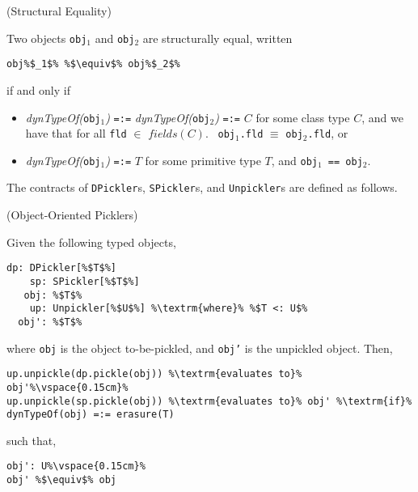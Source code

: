 \documentclass[preprint,10pt]{sigplanconf}
\theoremstyle{definition}
\newcommand{\term}[1]{\mbox{\texttt{#1}}}
\newcommand{\itl}[1]{\mbox{\textit{#1}}}
\begin{document}
\begin{defn}(Structural Equality)

\noindent Two objects \term{obj}$_1$ and \term{obj}$_2$ are structurally equal, written

\begin{lstlisting}[escapechar=\%]
obj%$_1$% %$\equiv$% obj%$_2$%
\end{lstlisting}

\noindent if and only if

\begin{itemize}
\item \itl{dynTypeOf(}\term{obj$_1$}\itl{)} \term{=:=} \itl{dynTypeOf(}\term{obj$_2$}\itl{)} \term{=:=} $C$
      for some class type $C$, and we have that for all \term{fld} $\in$ $\textit{fields}(C)$.
      ~\term{obj$_1$.fld} $\equiv$ \term{obj$_2$.fld}, or
\item \itl{dynTypeOf(}\term{obj$_1$}\itl{)} \term{=:=} $T$ for some primitive type $T$, and \term{obj$_1$ == obj$_2$}.
\end{itemize}
\end{defn}

The contracts of \term{DPickler}s, \term{SPickler}s, and \term{Unpickler}s are
defined as follows.

\begin{defn}(Object-Oriented Picklers)

\noindent Given the following typed objects,

\begin{lstlisting}[escapechar=\%]
    dp: DPickler[%$T$%]
    sp: SPickler[%$T$%]
   obj: %$T$%
    up: Unpickler[%$U$%] %\textrm{where}% %$T <: U$%
  obj': %$T$%
\end{lstlisting}

\noindent where \term{obj} is the object to-be-pickled, and \term{obj'} is the unpickled
object. Then,

\begin{lstlisting}[escapechar=\%]
up.unpickle(dp.pickle(obj)) %\textrm{evaluates to}% obj'%\vspace{0.15cm}%
up.unpickle(sp.pickle(obj)) %\textrm{evaluates to}% obj' %\textrm{if}% dynTypeOf(obj) =:= erasure(T)
\end{lstlisting}

\noindent such that,

\begin{lstlisting}[escapechar=\%]
obj': U%\vspace{0.15cm}%
obj' %$\equiv$% obj
\end{lstlisting}
\end{defn}
\end{document}
